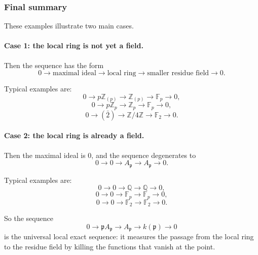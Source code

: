 \documentclass[12pt,a4paper]{article}
\theoremstyle{notespace}
\newcommand{\mf}{\mathfrak}
\theoremstyle{definition}
\begin{document}
\subsubsection{Final summary}

These examples illustrate two main cases.

\paragraph{Case 1: the local ring is not yet a field.}
Then the sequence has the form
\[
0
\longrightarrow
\text{maximal ideal}
\longrightarrow
\text{local ring}
\longrightarrow
\text{smaller residue field}
\longrightarrow 0.
\]

Typical examples are:
\[
0 \longrightarrow p\mathbb Z_{(p)} \longrightarrow \mathbb Z_{(p)} \longrightarrow \mathbb F_p \longrightarrow 0,
\]
\[
0 \longrightarrow p\mathbb Z_p \longrightarrow \mathbb Z_p \longrightarrow \mathbb F_p \longrightarrow 0,
\]
\[
0 \longrightarrow (\bar 2) \longrightarrow \mathbb Z/4\mathbb Z \longrightarrow \mathbb F_2 \longrightarrow 0.
\]

\paragraph{Case 2: the local ring is already a field.}
Then the maximal ideal is \(0\), and the sequence degenerates to
\[
0 \longrightarrow 0 \longrightarrow A_{\mf p} \longrightarrow A_{\mf p} \longrightarrow 0.
\]

Typical examples are:
\[
0 \longrightarrow 0 \longrightarrow \mathbb Q \longrightarrow \mathbb Q \longrightarrow 0,
\]
\[
0 \longrightarrow 0 \longrightarrow \mathbb F_p \longrightarrow \mathbb F_p \longrightarrow 0,
\]
\[
0 \longrightarrow 0 \longrightarrow \mathbb F_2 \longrightarrow \mathbb F_2 \longrightarrow 0.
\]

So the sequence
\[
0 \longrightarrow \mf p A_{\mf p} \longrightarrow A_{\mf p} \longrightarrow k(\mf p) \longrightarrow 0
\]
is the universal local exact sequence: it measures the passage from the local ring to the residue field by killing the functions that vanish at the point.
\end{document}
